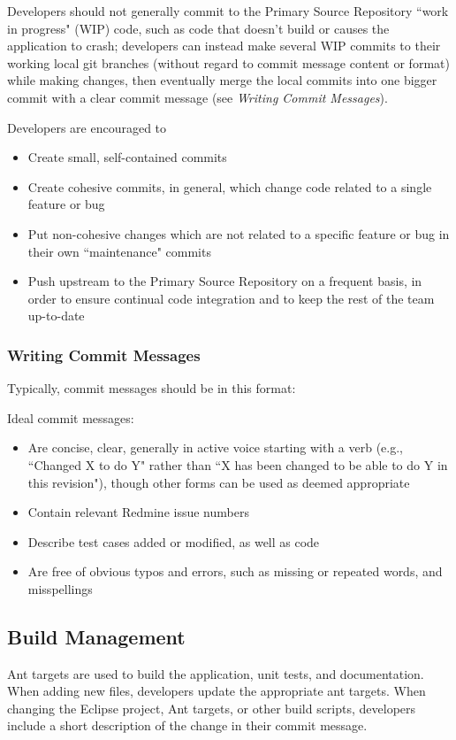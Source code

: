 \documentclass[11pt]{article}
\begin{document}
		Developers should not generally commit to the Primary Source Repository ``work in progress" (WIP) code, such as code that doesn't build or causes the application to crash; developers can instead make several WIP commits to their working local git branches (without regard to commit message content or format) while making changes, then eventually merge the local commits into one bigger commit with a clear commit message (see {\em Writing Commit Messages}).

		Developers are encouraged to
		\begin{itemize}
			\item{Create small, self-contained commits}
			\item{Create cohesive commits, in general, which change code related to a single feature or bug}
			\item{Put non-cohesive changes which are not related to a specific feature or bug in their own ``maintenance" commits}
			\item{Push upstream to the Primary Source Repository on a frequent basis, in order to ensure continual code integration and to keep the rest of the team up-to-date}
		\end{itemize}

		\subsubsection{Writing Commit Messages}
			Typically, commit messages should be in this format:

			
			\hspace{10mm}{\it Summary line}


			\hspace{10mm}{\it Optional longer description paragraph(s)}

			Ideal commit messages:
			\begin{itemize}
				\item{Are concise, clear, generally in active voice starting with a verb (e.g., ``Changed X to do Y" rather than ``X has been changed to be able to do Y in this revision"), though other forms can be used as deemed appropriate}
				\item{Contain relevant Redmine issue numbers}
				\item{Describe test cases added or modified, as well as code}
				\item{Are free of obvious typos and errors, such as missing or repeated words, and misspellings}
			\end{itemize}
	\subsection{Build Management}
		Ant targets are used to build the application, unit tests, and documentation. When adding new files, developers update the appropriate ant targets. When changing the Eclipse project, Ant targets, or other build scripts, developers include a short description of the change in their commit message.
\end{document}
